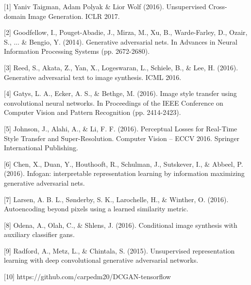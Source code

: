 \documentclass{article}
\begin{document}
\medskip

\small

[1] Yaniv Taigman, Adam Polyak \& Lior Wolf (2016). Unsupervised Cross-domain Image Generation. ICLR 2017.

[2] Goodfellow, I., Pouget-Abadie, J., Mirza, M., Xu, B., Warde-Farley, D., Ozair, S., ... \& Bengio, Y. (2014). Generative adversarial nets. In Advances in Neural Information Processing Systems (pp. 2672-2680).

[3] Reed, S., Akata, Z., Yan, X., Logeswaran, L., Schiele, B., \& Lee, H. (2016). Generative adversarial text to image synthesis. ICML 2016.

[4] Gatys, L. A., Ecker, A. S., \& Bethge, M. (2016). Image style transfer using convolutional neural networks. In Proceedings of the IEEE Conference on Computer Vision and Pattern Recognition (pp. 2414-2423).

[5] Johnson, J., Alahi, A., \& Li, F. F. (2016). Perceptual Losses for Real-Time Style Transfer and Super-Resolution. Computer Vision – ECCV 2016. Springer International Publishing.

[6] Chen, X., Duan, Y., Houthooft, R., Schulman, J., Sutskever, I., \& Abbeel, P. (2016). Infogan: interpretable representation learning by information maximizing generative adversarial nets.

[7] Larsen, A. B. L., Sønderby, S. K., Larochelle, H., \& Winther, O. (2016). Autoencoding beyond pixels using a learned similarity metric.

[8] Odena, A., Olah, C., \& Shlens, J. (2016). Conditional image synthesis with auxiliary classifier gans.

[9] Radford, A., Metz, L., \& Chintala, S. (2015). Unsupervised representation learning with deep convolutional generative adversarial networks.

[10] https://github.com/carpedm20/DCGAN-tensorflow
\end{document}
